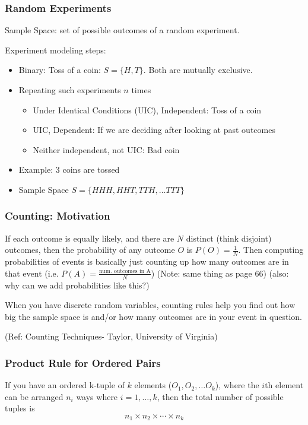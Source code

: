 \begin{frame}[fragile]\frametitle{Random Experiments}
Sample Space: set of possible outcomes of a random experiment.

Experiment modeling steps:
\begin{itemize}
\item Binary: Toss of a coin: $ S =\{ H, T\}$. Both are mutually exclusive.
\item Repeating such experiments $n$ times
\begin{itemize}
\item Under Identical Conditions (UIC), Independent: Toss of a coin
\item UIC, Dependent: If we are deciding after looking at past outcomes
\item Neither independent, not UIC: Bad coin
\end{itemize}
\item Example: 3 coins are tossed
\item Sample Space $S = \{ HHH, HHT, TTH, \ldots TTT\}$
\end{itemize}
\end{frame}

\begin{frame}
\frametitle{Counting: Motivation}

If each outcome is equally likely, and there are $N$ distinct (think disjoint) outcomes, then the probability of any outcome $O$ is $P(O) = \frac{1}{N}$. Then computing probabilities of events is basically just counting up how many outcomes are in that event (i.e. $P(A) = \frac{\text{num. outcomes in A}}{N}$) (Note: same thing as page 66) (also: why can we add probabilities like this?)
\newline

When you have discrete random variables, counting rules help you find out how big the sample space is and/or how many outcomes are in your event in question.

(Ref:  Counting Techniques- Taylor, University of Virginia)
\end{frame}

\begin{frame}
\frametitle{Product Rule for Ordered Pairs}

If you have an ordered k-tuple of $k$ elements ($O_1, O_2, \ldots O_k$), where the $i$th element can be arranged $n_i$ ways where $i = 1, \ldots, k$, then the total number of possible tuples is 
\[
n_1 \times n_2 \times \cdots \times n_k
\]


\end{frame}

